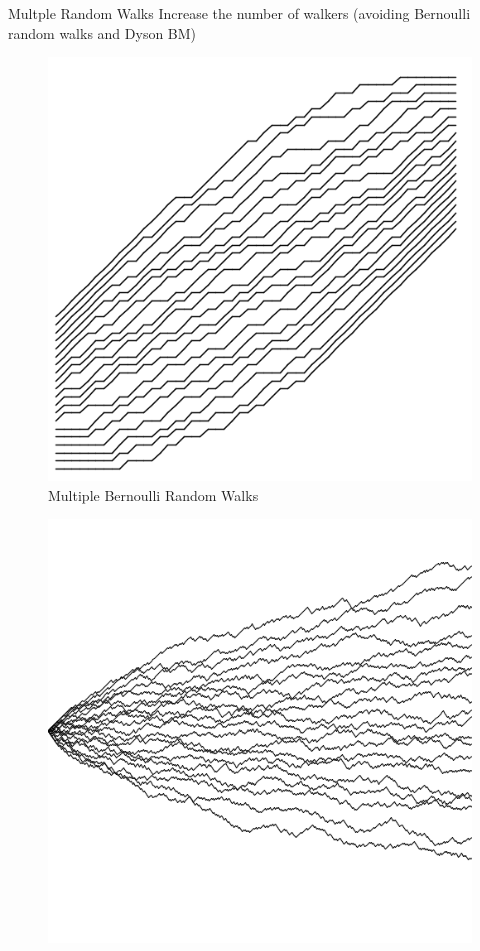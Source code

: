 \documentclass[9pt,t]{beamer}
\begin{document}
\begin{frame}{Multple Random Walks}
Increase the number of walkers (avoiding Bernoulli random walks and Dyson BM)
\begin{figure}
	\includegraphics[height=0.25\textheight]{graphics/MultipleBernoulli.png}
	\caption{Multiple Bernoulli Random Walks}
\end{figure}
\begin{figure}
\includegraphics[height=0.25\textheight]{graphics/DysonBrownian.png}
\end{figure}
\end{frame}
\end{document}
